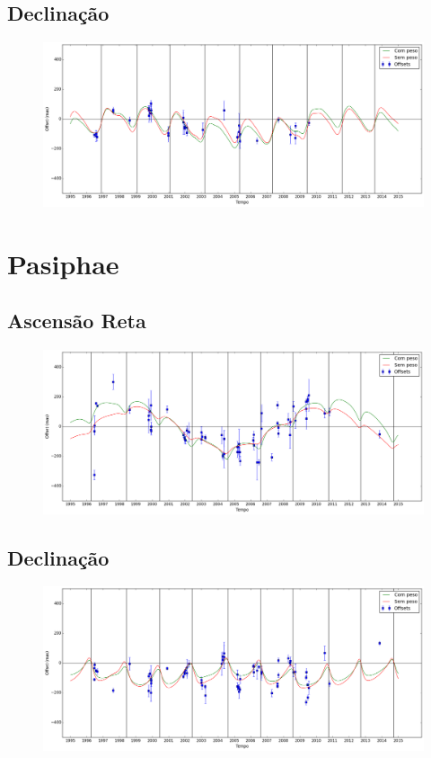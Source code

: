 \documentclass[11pt,a4paper]{report}
\begin{document}
\section*{Declinação}

\begin{figure}[h]
\includegraphics[scale=0.35]{Sinope/DEC.png} 
\end{figure}

\chapter*{Pasiphae}
\section*{Ascensão Reta}

\begin{figure}[h]
\includegraphics[scale=0.35]{Pasiphae/RA.png} 
\end{figure}

\section*{Declinação}

\begin{figure}[h]
\includegraphics[scale=0.35]{Pasiphae/DEC.png} 
\end{figure}
\end{document}
